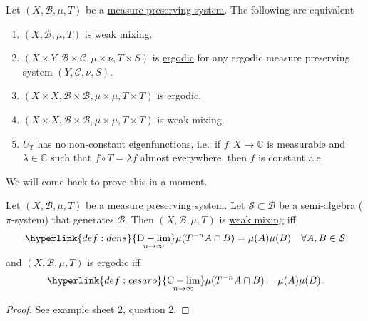 \documentclass{article}
\DeclareMathOperator*{\dlim}{D-lim}
\DeclareMathOperator*{\clim}{C-lim}
\begin{document}
\begin{thm}
  Let $(X,\mathcal{B}, \mu, T)$ be a \hyperlink{def:mps}{measure preserving system}.
  The following are equivalent
  \begin{enumerate}[label=(\arabic*)]
    \item $(X, \mathcal{B}, \mu, T)$ is \hyperlink{def:wMixing}{weak mixing}.
    \item $(X \times Y, \mathcal{B} \times \mathcal{C}, \mu \times \nu, T \times S)$ is \hyperlink{def:ergodic}{ergodic} for any ergodic measure preserving system $(Y, \mathcal{C}, \nu, S).$
    \item $(X \times X, \mathcal{B} \times \mathcal{B}, \mu \times \mu, T \times T)$ is ergodic.
    \item $(X \times X, \mathcal{B} \times \mathcal{B}, \mu \times \mu, T \times T)$ is weak mixing.
    \item $U_T$ has no non-constant eigenfunctions, i.e.\ if $f: X \to \mathbb{C}$ is measurable and $\lambda \in \mathbb{C}$ such that $f \circ T = \lambda f$ almost everywhere, then $f$ is constant a.e.
  \end{enumerate}
\end{thm}
We will come back to prove this in a moment.
\begin{lemma}
  Let $(X,\mathcal{B}, \mu, T)$ be a \hyperlink{def:mps}{measure preserving system}.
  Let $\mathcal{S} \subset \mathcal{B}$ be a semi-algebra ($\pi$-system) that generates $\mathcal{B}$.
  Then $(X, \mathcal{B}, \mu, T)$ is \hyperlink{def:wMixing}{weak mixing} iff
  \begin{equation*}
    \hyperlink{def:dens}{\dlim_{n \to \infty}} \mu(T^{-n} A \cap B) = \mu(A) \mu(B) \quad \forall A, B \in \mathcal{S}
  \end{equation*}
  and $(X, \mathcal{B}, \mu, T)$ is ergodic iff
  \begin{equation*}
    \hyperlink{def:cesaro}{\clim_{n \to \infty}} \mu(T^{-n} A \cap B) = \mu(A) \mu(B).
  \end{equation*}
\end{lemma}
\begin{proof}
  See example sheet 2, question 2.
\end{proof}
\end{document}
